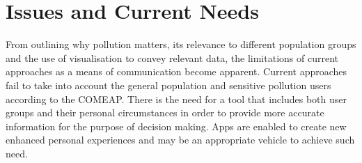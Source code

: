 \section{Issues and Current Needs}
From outlining why pollution matters, its relevance to different population groups and the use of visualisation to convey relevant data, the limitations of current approaches as a means of communication become apparent. Current approaches fail to take into account the general population and sensitive pollution users according to the COMEAP. There is the need for a tool that includes both user groups and their personal circumstances in order to provide more accurate information for the purpose of decision making. Apps are enabled to create new enhanced personal experiences and may be an appropriate vehicle to achieve such need.